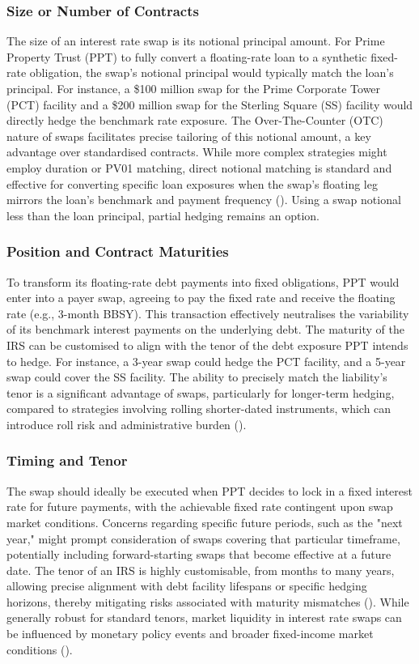 \documentclass[11pt, a4paper, british]{article}
\begin{document}
\subsubsection{Size or Number of Contracts}
The size of an interest rate swap is its notional principal amount. For Prime Property Trust (PPT) to fully convert a floating-rate loan to a synthetic fixed-rate obligation, the swap's notional principal would typically match the loan's principal. For instance, a \$100 million swap for the Prime Corporate Tower (PCT) facility and a \$200 million swap for the Sterling Square (SS) facility would directly hedge the benchmark rate exposure. The Over-The-Counter (OTC) nature of swaps facilitates precise tailoring of this notional amount, a key advantage over standardised contracts. While more complex strategies might employ duration or PV01 matching, direct notional matching is standard and effective for converting specific loan exposures when the swap's floating leg mirrors the loan's benchmark and payment frequency (\cite{ml}). Using a swap notional less than the loan principal, partial hedging remains an option.

\subsubsection{Position and Contract Maturities}
To transform its floating-rate debt payments into fixed obligations, PPT would enter into a payer swap, agreeing to pay the fixed rate and receive the floating rate (e.g., 3-month BBSY). This transaction effectively neutralises the variability of its benchmark interest payments on the underlying debt. The maturity of the IRS can be customised to align with the tenor of the debt exposure PPT intends to hedge. For instance, a 3-year swap could hedge the PCT facility, and a 5-year swap could cover the SS facility. The ability to precisely match the liability's tenor is a significant advantage of swaps, particularly for longer-term hedging, compared to strategies involving rolling shorter-dated instruments, which can introduce roll risk and administrative burden (\cite{d}).

\subsubsection{Timing and Tenor}
The swap should ideally be executed when PPT decides to lock in a fixed interest rate for future payments, with the achievable fixed rate contingent upon swap market conditions. Concerns regarding specific future periods, such as the "next year," might prompt consideration of swaps covering that particular timeframe, potentially including forward-starting swaps that become effective at a future date. The tenor of an IRS is highly customisable, from months to many years, allowing precise alignment with debt facility lifespans or specific hedging horizons, thereby mitigating risks associated with maturity mismatches (\cite{t}). While generally robust for standard tenors, market liquidity in interest rate swaps can be influenced by monetary policy events and broader fixed-income market conditions (\cite{bfs}).
\end{document}
